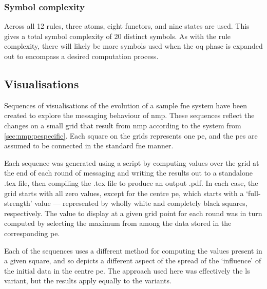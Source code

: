 \subsubsection{Symbol complexity}
Across all 12 rules, three atoms, eight functors, and nine states are used.  This gives a total symbol complexity of 20 distinct symbols.  As with the rule complexity, there will likely be more symbols used when the \gls{oq} phase is expanded out to encompass a desired computation process.

\subsection{Visualisations}
Sequences of visualisations of the evolution of a sample \gls{fne} system have been created to explore the messaging behaviour of \gls{nmp}.  These sequences reflect the changes on a small grid that result from \gls{nmp} according to the system from \autoref{sec:nmp:pespecific}.  Each square on the grids represents one \gls{pe}, and the \glspl{pe} are assumed to be connected in the standard \gls{fne} manner.

Each sequence was generated using a script by computing values over the grid at the end of each round of messaging and writing the results out to a standalone .tex file, then compiling the .tex file to produce an output .pdf.  In each case, the grid starts with all zero values, except for the centre \gls{pe}, which starts with a `full-strength' value --- represented by wholly white and completely black squares, respectively.  The value to display at a given grid point for each round was in turn computed by selecting the maximum from among the data stored in the corresponding \gls{pe}.

Each of the sequences uses a different method for computing the values present in a given square, and so depicts a different aspect of the spread of the `influence' of the initial data in the centre \gls{pe}.  The approach used here was effectively the \gls{ls} variant, but the results apply equally to the variants.

